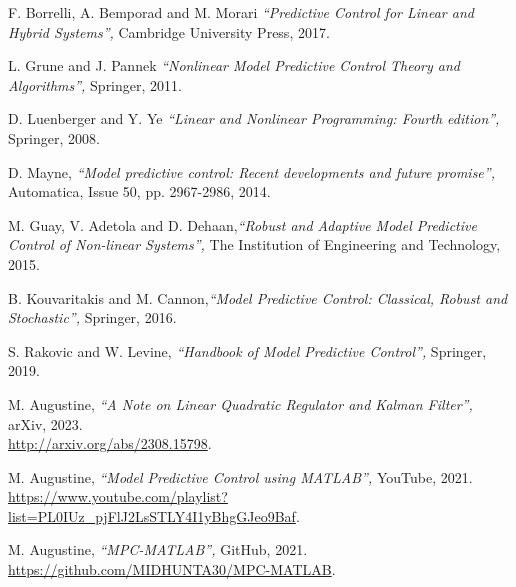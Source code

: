 \documentclass{article}
\begin{document}
\begin{thebibliography}{1}

   F. Borrelli, A. Bemporad and M. Morari \emph{\textquotedblleft Predictive Control for Linear and Hybrid Systems\textquotedblright,} Cambridge University Press, 2017. 

   
   L. Grune and J. Pannek \emph{\textquotedblleft Nonlinear Model Predictive Control
Theory and Algorithms\textquotedblright,} Springer, 2011.

   D. Luenberger and  Y. Ye \emph{\textquotedblleft  Linear and Nonlinear Programming: Fourth edition\textquotedblright,} Springer, 2008.
   
    D. Mayne, \emph{\textquotedblleft Model predictive control: Recent developments and future promise\textquotedblright,} Automatica, Issue  50, pp. 2967-2986, 2014.
    
    
   M. Guay, V. Adetola and D. Dehaan,\emph{\textquotedblleft     Robust and Adaptive Model Predictive Control of Non-linear Systems\textquotedblright,} The Institution of Engineering and Technology, 2015.
    

    
   B. Kouvaritakis and M. Cannon,\emph{\textquotedblleft Model Predictive Control:
Classical, Robust and Stochastic\textquotedblright,} 
    Springer, 2016.
    
     
    
   S. Rakovic and W. Levine, \emph{\textquotedblleft Handbook of Model
Predictive Control\textquotedblright,} Springer, 2019. 
    
   M. Augustine, \emph{\textquotedblleft A Note on Linear Quadratic Regulator and Kalman Filter\textquotedblright,} arXiv, 2023.\\
   \url{http://arxiv.org/abs/2308.15798}. 

   M. Augustine, \emph{\textquotedblleft Model Predictive Control using MATLAB\textquotedblright,} YouTube, 2021.\\
   \url{https://www.youtube.com/playlist?list=PL0IUz_pjFlJ2LsSTLY4I1yBhgGJeo9Baf}. 
  
   M. Augustine, \emph{\textquotedblleft MPC-MATLAB\textquotedblright,} GitHub, 2021.\\
   \url{https://github.com/MIDHUNTA30/MPC-MATLAB}. 
  

\end{thebibliography}
\end{document}
